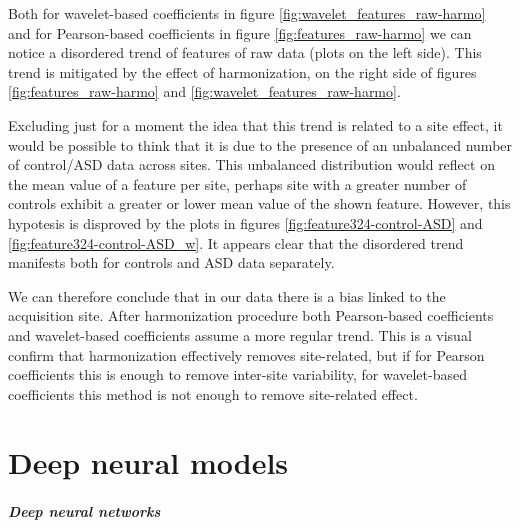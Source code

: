 \documentclass[11pt]{report}
\begin{document}
\hfill

Both for wavelet-based coefficients in figure \ref{fig:wavelet_features_raw-harmo} and for Pearson-based coefficients in figure \ref{fig:features_raw-harmo} we can notice a disordered trend of features of raw data (plots on the left side).
This trend is mitigated by the effect of harmonization, on the right side of figures  \ref{fig:features_raw-harmo} and \ref{fig:wavelet_features_raw-harmo}.

Excluding just for a moment the idea that this trend is related to a site effect, it would be possible to think that it is due to the presence of an unbalanced number of control/ASD data across sites.
This unbalanced distribution would reflect on the mean value of a feature per site, perhaps site with a greater number of controls exhibit a greater or lower mean value of the shown feature.
However, this hypotesis is disproved by the plots in figures \ref{fig:feature324-control-ASD} and \ref{fig:feature324-control-ASD_w}.
It appears clear that the disordered trend manifests both for controls and ASD data separately.

We can therefore conclude that in our data there is a bias linked to the acquisition site.
After harmonization procedure both Pearson-based coefficients and wavelet-based coefficients assume a more regular trend.
This is a visual confirm that harmonization effectively removes site-related, but if for Pearson coefficients this is enough to remove inter-site variability, for wavelet-based coefficients this method is not enough to remove site-related effect.




\newpage
\chapter{Deep neural models} \label{chap:deep_models}
\paragraph{Deep neural networks}\hfill
\end{document}
